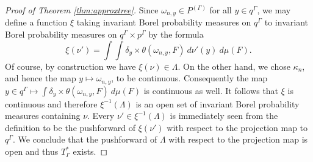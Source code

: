 \documentclass[12pt]{amsart}
\theoremstyle{definition}
\begin{document}
\begin{proof}[Proof of Theorem \ref{thm:approxtree}]
	Since $\omega_{n,y} \in P^{(\Gamma)}$ for all $y \in q^\Gamma$, we may define a function $\xi$ taking invariant Borel probability measures on $q^\Gamma$ to invariant Borel probability measures on $q^\Gamma \times p^\Gamma$ by the formula
	\[\xi(\nu') = \int \int \delta_y \times \theta(\omega_{n,y}, F) \ d \nu'(y) \ d \mu(F).\]
	Of course, by construction we have $\xi(\nu) \in \Lambda$. On the other hand, we chose $\kappa_n$, and hence the map $y \mapsto \omega_{n,y}$, to be continuous. Consequently the map $y \in q^\Gamma \mapsto \int \delta_y \times \theta(\omega_{n,y}, F) \ d \mu(F)$ is continuous as well. It follows that $\xi$ is continuous and therefore $\xi^{-1}(\Lambda)$ is an open set of invariant Borel probability measures containing $\nu$. Every $\nu' \in \xi^{-1}(\Lambda)$ is immediately seen from the definition to be the pushforward of $\xi(\nu')$ with respect to the projection map to $q^\Gamma$. We conclude that the pushforward of $\Lambda$ with respect to the projection map is open and thus $T_\Gamma^*$ exists.
\end{proof}
\end{document}
